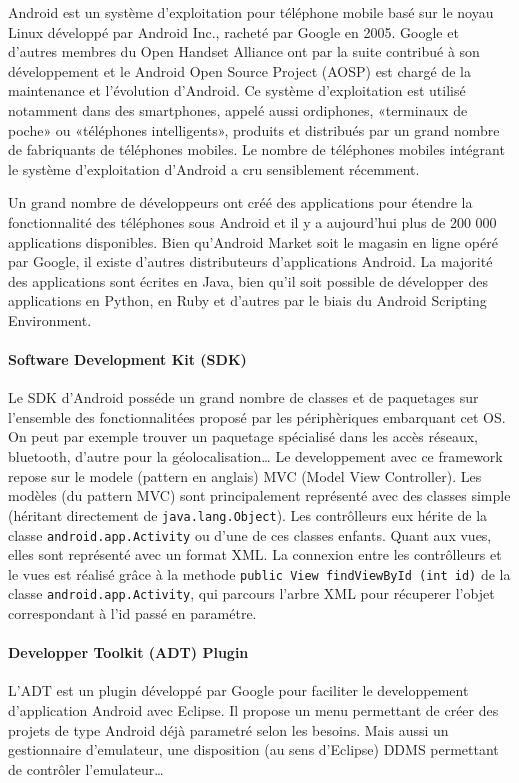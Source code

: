 \documentclass[a4paper,11pt,french]{article}
\def\android{Android\texttrademark{}}
\begin{document}
\android{} est un système d'exploitation pour téléphone mobile basé sur le noyau Linux développé par \android{} Inc., racheté par Google en 2005. Google et d'autres membres du Open Handset Alliance ont par la suite contribué à son développement et le \android{} Open Source Project (AOSP) est chargé de la maintenance et l'évolution d'\android{}. Ce système d'exploitation est utilisé notamment dans des smartphones, appelé aussi ordiphones, «terminaux de poche» ou «téléphones intelligents», produits et distribués par un grand nombre de fabriquants de téléphones mobiles. Le nombre de téléphones mobiles intégrant le système d'exploitation d'\android{} a cru sensiblement récemment.

Un grand nombre de développeurs ont créé des applications pour étendre la fonctionnalité des téléphones sous \android{} et il y a aujourd'hui
plus de 200 000 applications disponibles. Bien qu'\android{} Market soit le magasin en ligne opéré par Google, il existe d'autres distributeurs
d'applications \android{}. La majorité des applications sont écrites en Java, bien qu'il soit possible de développer des applications en
Python, en Ruby et d'autres par le biais du \android{} Scripting Environment.

\paragraph{Software Development Kit (SDK)}
Le SDK d'\android{} posséde un grand nombre de classes et de paquetages sur l'ensemble des fonctionnalitées proposé par les périphèriques embarquant cet OS. On peut par exemple trouver un paquetage spécialisé dans les accès réseaux, bluetooth, d'autre pour la géolocalisation\dots{} Le developpement avec ce framework repose sur le modele (pattern en anglais) MVC (Model View Controller). Les modèles (du pattern MVC) sont principalement représenté avec des classes simple (héritant directement de \verb!java.lang.Object!). Les contrôlleurs eux hérite de la classe \verb!android.app.Activity! ou d'une de ces classes enfants. Quant aux vues, elles sont représenté avec un format XML.
La connexion entre les contrôlleurs et le vues est réalisé grâce à la methode \verb!public View findViewById (int id)! de la classe \verb!android.app.Activity!, qui parcours l'arbre XML pour récuperer l'objet correspondant à l'id passé en paramétre.

\paragraph{Developper Toolkit (ADT) Plugin}
L'ADT est un plugin développé par Google pour faciliter le developpement d'application \android{} avec Eclipse. Il propose un menu permettant de créer des projets de type \android{} déjà parametré selon les besoins. Mais aussi un gestionnaire d'emulateur, une disposition (au sens d'Eclipse) DDMS permettant de contrôler l'emulateur\dots{}
\end{document}
